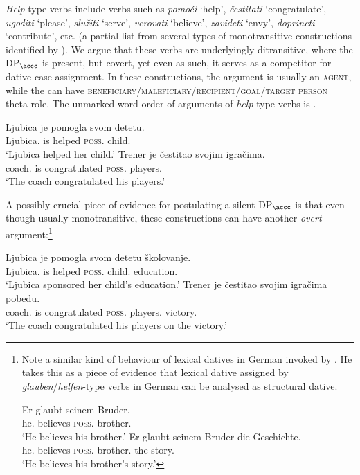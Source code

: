 \documentclass[output=paper,
modfonts,
newtxmath,
hidelinks
]{langscibook}
\begin{document}
\textit{Help}-type verbs include verbs such as \textit{pomo\'{c}i} `help', \textit{čestitati} `congratulate', \textit{ugoditi} `please', \textit{slu\v{z}iti} `serve', \textit{verovati} `believe', \textit{zavideti} `envy', \textit{doprineti} `contribute', etc. (a partial list from several types of monotransitive  constructions identified by \citealt{stipcevic}). We argue that these verbs are underlyingly ditransitive, where the  DP$_{\accc}$ is present, but covert, yet even as such, it serves as a competitor for dative case assignment. In these constructions, the \nomm{} argument is usually an \textsc{agent}, while the \datt{} can have \textsc{be\-ne\-fi\-ciary}/\textsc{male\-fi\-ciary}/\textsc{re\-ci\-pi\-ent}/\textsc{goal}/\textsc{tar\-get person} theta-role. The unmarked word order of arguments of \textit{help}-type verbs is \nomm{} \before{} \datt{} .

\ea\label{ex26}
\ea\gll Ljubica je pomogla svom detetu.\\
Ljubica.\nomm{} is helped \textsc{poss}.\datt{} child.\datt\\
\glt `Ljubica helped her child.'
\ex\gll Trener je  čestitao svojim igračima.\\
coach.\nomm{} is congratulated \textsc{poss}.\datt{} players.\datt\\
\glt `The coach congratulated his players.'
\z \z

\noindent A possibly crucial piece of evidence for postulating a silent DP$_{\accc}$ is that even though usually monotransitive, these constructions can have another \textit{overt} \accc{} argument:\footnote{Note a similar kind of behaviour of lexical datives in German invoked by \citep[129]{mcfadden04}. He takes this as a piece of evidence that lexical dative assigned by \textit{glauben}/\textit{helfen}-type verbs in German can be analysed as structural dative.
	
	\ea
	\ea\gll Er glaubt seinem Bruder.\\
	he.\nomm{} believes \textsc{poss}.\datt{} brother.\datt\\
	\glt `He believes his brother.'
	\ex\gll Er glaubt seinem Bruder die Geschichte.\\
	he.\nomm{} believes \textsc{poss}.\datt{} brother.\datt{} the story.\accc\\
	\glt `He believes his brother's story.'
    \z \z
	
	
}


\ea\label{overtsilentdp}
\ea\gll Ljubica je pomogla svom detetu školovanje.\\
Ljubica.\nomm{} is helped \textsc{poss}.\datt{} child.\datt{} education.\accc\\
\glt `Ljubica sponsored her child's education.'
\ex\gll Trener je čestitao svojim igračima pobedu.\\
coach.\nomm{} is congratulated \textsc{poss}.\datt{} players.\datt{} victory.\accc\\
\glt `The coach congratulated his players on the victory.'
\z \z
\end{document}
